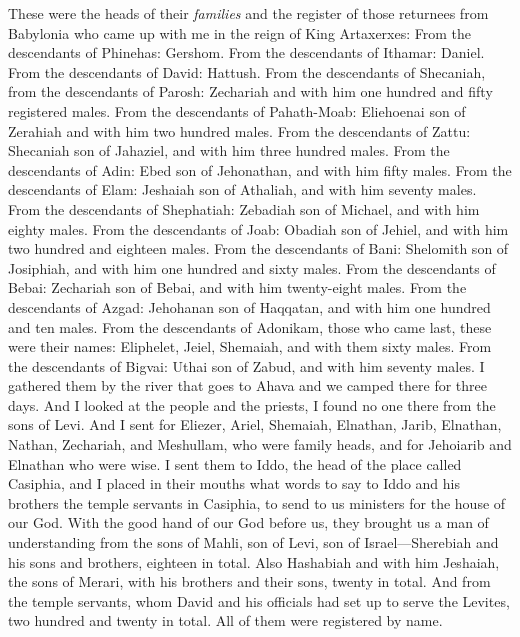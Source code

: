 \begin{biblechapter} %
 These were the heads of their \textit{families} and the register of those returnees from Babylonia who came up with me in the reign of King Artaxerxes:
\verse From the descendants of Phinehas: Gershom. From the descendants of Ithamar: Daniel. From the descendants of David: Hattush.
\verse From the descendants of Shecaniah, from the descendants of Parosh: Zechariah and with him one hundred and fifty registered males.
\verse From the descendants of Pahath-Moab: Eliehoenai son of Zerahiah and with him two hundred males.
\verse From the descendants of Zattu: Shecaniah son of Jahaziel, and with him three hundred males.
\verse From the descendants of Adin: Ebed son of Jehonathan, and with him fifty males.
\verse From the descendants of Elam: Jeshaiah son of Athaliah, and with him seventy males.
\verse From the descendants of Shephatiah: Zebadiah son of Michael, and with him eighty males.
\verse From the descendants of Joab: Obadiah son of Jehiel, and with him two hundred and eighteen males.
\verse From the descendants of Bani: Shelomith son of Josiphiah, and with him one hundred and sixty males.
\verse From the descendants of Bebai: Zechariah son of Bebai, and with him twenty-eight males.
\verse From the descendants of Azgad: Jehohanan son of Haqqatan, and with him one hundred and ten males.
\verse From the descendants of Adonikam, those who came last, these were their names: Eliphelet, Jeiel, Shemaiah, and with them sixty males.
\verse From the descendants of Bigvai: Uthai son of Zabud, and with him seventy males.
 I gathered them by the river that goes to Ahava and we camped there for three days. And I looked at the people and the priests, I found no one there from the sons of Levi.
\verse And I sent for Eliezer, Ariel, Shemaiah, Elnathan, Jarib, Elnathan, Nathan, Zechariah, and Meshullam, who were family heads, and for Jehoiarib and Elnathan who were wise.
\verse I sent them to Iddo, the head of the place called Casiphia, and I placed in their mouths what words to say to Iddo and his brothers the temple servants in Casiphia, to send to us ministers for the house of our God.
\verse With the good hand of our God before us, they brought us a man of understanding from the sons of Mahli, son of Levi, son of Israel—Sherebiah and his sons and brothers, eighteen in total.
\verse Also Hashabiah and with him Jeshaiah, the sons of Merari, with his brothers and their sons, twenty in total.
\verse And from the temple servants, whom David and his officials had set up to serve the Levites, two hundred and twenty in total. All of them were registered by name.

\end{biblechapter}
